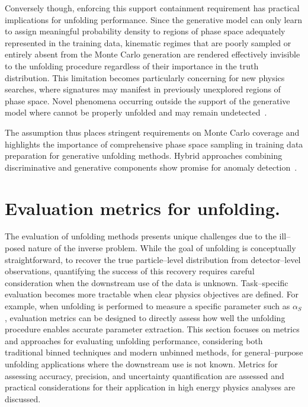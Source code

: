            Conversely though, enforcing this support containment requirement has practical implications for unfolding performance.
            Since the generative model can only learn to assign meaningful probability density to regions of phase space adequately represented in the training data, kinematic regimes that are poorly sampled or entirely absent from the Monte Carlo generation are rendered effectively invisible to the unfolding procedure regardless of their importance in the truth distribution.
            This limitation becomes particularly concerning for new physics searches, where signatures may manifest in previously unexplored regions of phase space.
            Novel phenomena occurring outside the support of the generative model where cannot be properly unfolded and may remain undetected~\cite{Amsler2008MonteTechniques}. 
            
            The assumption thus places stringent requirements on Monte Carlo coverage and highlights the importance of comprehensive phase space sampling in training data preparation for generative unfolding methods.
            Hybrid approaches combining discriminative and generative components show promise for anomaly detection~\cite{DiMattia2019ADetection, Terjek2019AdversarialRegularization}.
\section{Evaluation metrics for unfolding.}
    The evaluation of unfolding methods presents unique challenges due to the ill--posed nature of the inverse problem.
    While the goal of unfolding is conceptually straightforward, to recover the true particle--level distribution from detector--level observations, quantifying the success of this recovery requires careful consideration when the downstream use of the data is unknown.
    Task--specific evaluation becomes more tractable when clear physics objectives are defined.
    For example, when unfolding is performed to measure a specific parameter such as \(\alpha_S\), evaluation metrics can be designed to directly assess how well the unfolding procedure enables accurate parameter extraction.
    This section focuses on metrics and approaches for evaluating unfolding performance, considering both traditional binned techniques and modern unbinned methods, for general--purpose unfolding applications where the downstream use is not known.
    Metrics for assessing accuracy, precision, and uncertainty quantification are assessed and practical considerations for their application in high energy physics analyses are discussed.

